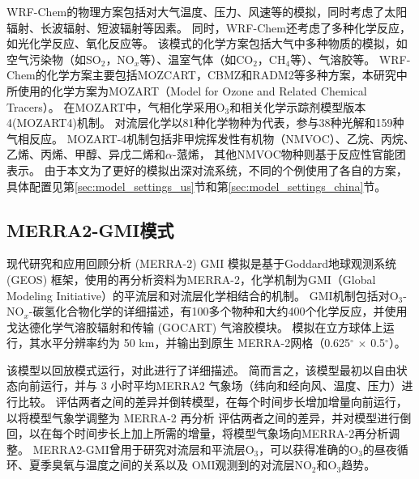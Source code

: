 WRF-Chem的物理方案包括对大气温度、压力、风速等的模拟，同时考虑了太阳辐射、长波辐射、短波辐射等因素。
同时，WRF-Chem还考虑了多种化学反应，如光化学反应、氧化反应等。
该模式的化学方案包括大气中多种物质的模拟，如空气污染物（如SO$_2$，NO$_x$等）、温室气体（如CO$_2$，CH$_4$等）、气溶胶等。
WRF-Chem的化学方案主要包括MOZCART，CBMZ和RADM2等多种方案，本研究中所使用的化学方案为MOZART（Model for Ozone and Related Chemical Tracers）。
在MOZART中，气相化学采用O$_3$和相关化学示踪剂模型版本4(MOZART4)机制\citep{Emmons.2010}。
对流层化学以81种化学物种为代表，参与38种光解和159种气相反应。
MOZART-4机制包括非甲烷挥发性有机物（NMVOC）、乙烷、丙烷、乙烯、丙烯、甲醇、异戊二烯和$\alpha$-蒎烯，
其他NMVOC物种则基于反应性官能团表示。
由于本文为了更好的模拟出深对流系统，不同的个例使用了各自的方案，具体配置见第\ref{sec:model_settings_us}节和第\ref{sec:model_settings_china}节。



\subsection{MERRA2-GMI模式}

现代研究和应用回顾分析 (MERRA-2) GMI 模拟是基于Goddard地球观测系统 (GEOS) 框架\citep{Molod.2015}，使用的再分析资料为MERRA-2\citep{Gelaro.2017}，化学机制为GMI（Global Modeling Initiative）的平流层和对流层化学相结合的机制\citep{Duncan.2007,Oman.2013,Nielsen.2017}。
GMI机制包括对O$_3$-NO$_x$-碳氢化合物化学的详细描述，有100多个物种和大约400个化学反应，并使用戈达德化学气溶胶辐射和传输 (GOCART) 气溶胶模块。
模拟在立方球体上运行，其水平分辨率约为 50 km，并输出到原生 MERRA-2网格（0.625$^{\circ}$ $\times$ 0.5$^{\circ}$）。

该模型以回放模式运行，\citet{Orbe.2017}对此进行了详细描述。
简而言之，该模型最初以自由状态向前运行，并与 3 小时平均MERRA2 气象场（纬向和经向风、温度、压力）进行比较。
评估两者之间的差异并倒转模型，在每个时间步长增加增量向前运行，以将模型气象学调整为 MERRA-2 再分析
评估两者之间的差异，并对模型进行倒回，以在每个时间步长上加上所需的增量，将模型气象场向MERRA-2再分析调整。
MERRA2-GMI曾用于研究对流层和平流层O$_3$，可以获得准确的O$_3$的昼夜循环、夏季臭氧与温度之间的关系以及 OMI观测到的对流层NO$_2$和O$_3$趋势\citep{Strode.2017,Ziemke.2017,Ziemke.2019}。
